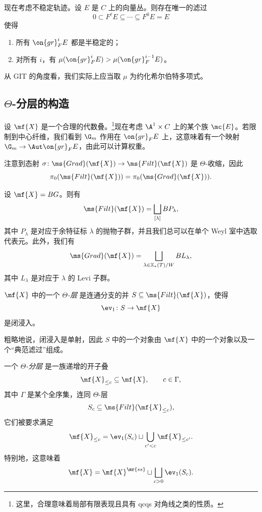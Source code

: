 现在考虑不稳定轨迹。设 \(E\) 是 \(C\) 上的向量丛。则存在唯一的滤过
\[ 0 \subset F^{\ell} E \subseteq \cdots \subseteq F^0 E = E \]
使得
\begin{enumerate}
    \item 所有 \(\on{gr}_F^i E\) 都是半稳定的；
    \item 对所有 \(i\)，有 \(\mu(\on{gr}_F^i E) > \mu(\on{gr}_F^{i-1} E)\)。 
\end{enumerate}
\begin{rmk}
    从 GIT 的角度看，我们实际上应当取 \(\mu\) 为约化希尔伯特多项式。
\end{rmk}

\subsection{\(\Theta\)-分层的构造}%
\label{sub:Construction of Theta-stratifications}

设 \(\mf{X}\) 是一个合理的代数叠。\footnote{这里，合理意味着局部有限表现且具有 qcqs 对角线之类的性质。}现在考虑 \(\A^1 \times C\) 上的某个族 \(\mc{E}\)。若限制到中心纤维，我们看到 \(\G_m\) 作用在 \(\on{gr}_F E\) 上，这意味着有一个映射 \(\G_m \to \Aut \on{gr}_F E\)，由此可以计算权重。

注意到态射 \(\sigma \colon \ms{Grad}(\mf{X}) \to \ms{Filt}(\mf{X})\) 是 \(\Theta\)-收缩，因此
\[ \pi_0(\ms{Filt}(\mf{X})) = \pi_0(\ms{Grad}(\mf{X})). \]

\begin{exm}
    设 \(\mf{X} = BG\)。则有
    \[\ms{Filt}(\mf{X}) = \bigsqcup_{[\lambda]} B P_{\lambda}, \]
    其中 \(P_{\lambda}\) 是对应于余特征标 \(\lambda\) 的抛物子群，并且我们总可以在单个 Weyl 室中选取代表元。此外，我们有
    \[ \ms{Grad}(\mf{X}) = \bigsqcup_{\lambda \in \mathbb{X}_*(T)/W} B L_{\lambda}, \]
    其中 \(L_{\lambda}\) 是对应于 \(\lambda\) 的 Levi 子群。
\end{exm}

\begin{defn}
    \(\mf{X}\) 中的一个 \textit{\(\Theta\)-层} 是连通分支的并 \(S \subseteq \ms{Filt}(\mf{X})\)，使得
    \[ \ev_1 \colon S \to \mf{X} \]
    是闭浸入。
\end{defn}

粗略地说，闭浸入是单射，因此 \(S\) 中的一个对象由 \(\mf{X}\) 中的一个对象以及一个“典范滤过”组成。

\begin{defn}
    一个 \textit{\(\Theta\)-分层} 是一族递增的开子叠
    \[ \mf{X}_{\leq c} \subseteq \mf{X}, \qquad c \in \Gamma, \]
    其中 \(\Gamma\) 是某个全序集，连同 \(\Theta\)-层
    \[ S_c \subseteq \ms{Filt}(\mf{X}_{\leq c}), \]
    它们被要求满足
    \[ \mf{X}_{\leq c} = \ev_1(S_c) \sqcup \bigcup_{c' < c} \mf{X}_{\leq c'}. \]
    特别地，这意味着
    \[ \mf{X} = \mf{X}^{\mr{ss}} \sqcup \bigsqcup_{c > 0} \ev_1(S_c). \]
\end{defn}

